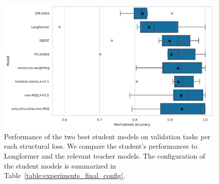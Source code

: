 \begin{figure}
    \centering
    \includegraphics[width=\textwidth]{img/experiments_final_models.pdf}

    \caption{Performance of the two best student models on validation tasks per
    each structural loss. We compare the student's performances to Longformer
    and the relevant teacher models. The configuration of the student models is
    summarized in Table~\ref{table:experiments_final_config}.}

    \label{fig:experiments_final_comparison}

\end{figure}

